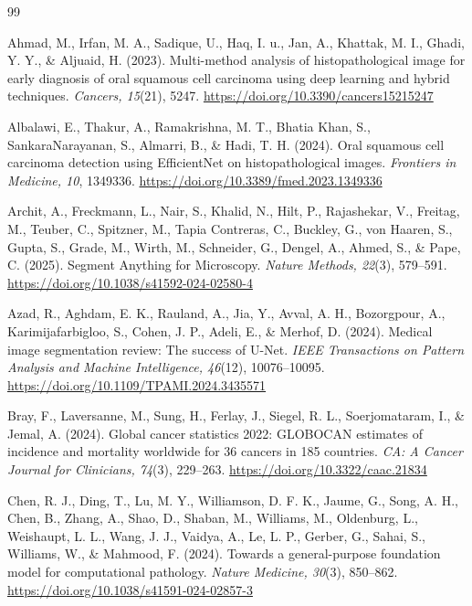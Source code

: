 \documentclass[10pt,twocolumn]{article}
\begin{document}
\begin{thebibliography}{99}
\footnotesize

Ahmad, M., Irfan, M. A., Sadique, U., Haq, I. u., Jan, A., Khattak, M. I., Ghadi, Y. Y., \& Aljuaid, H. (2023). Multi-method analysis of histopathological image for early diagnosis of oral squamous cell carcinoma using deep learning and hybrid techniques. \textit{Cancers, 15}(21), 5247. \url{https://doi.org/10.3390/cancers15215247}

Albalawi, E., Thakur, A., Ramakrishna, M. T., Bhatia Khan, S., SankaraNarayanan, S., Almarri, B., \& Hadi, T. H. (2024). Oral squamous cell carcinoma detection using EfficientNet on histopathological images. \textit{Frontiers in Medicine, 10}, 1349336. \url{https://doi.org/10.3389/fmed.2023.1349336}

Archit, A., Freckmann, L., Nair, S., Khalid, N., Hilt, P., Rajashekar, V., Freitag, M., Teuber, C., Spitzner, M., Tapia Contreras, C., Buckley, G., von Haaren, S., Gupta, S., Grade, M., Wirth, M., Schneider, G., Dengel, A., Ahmed, S., \& Pape, C. (2025). Segment Anything for Microscopy. \textit{Nature Methods, 22}(3), 579--591. \url{https://doi.org/10.1038/s41592-024-02580-4}

Azad, R., Aghdam, E. K., Rauland, A., Jia, Y., Avval, A. H., Bozorgpour, A., Karimijafarbigloo, S., Cohen, J. P., Adeli, E., \& Merhof, D. (2024). Medical image segmentation review: The success of U-Net. \textit{IEEE Transactions on Pattern Analysis and Machine Intelligence, 46}(12), 10076--10095. \url{https://doi.org/10.1109/TPAMI.2024.3435571}

Bray, F., Laversanne, M., Sung, H., Ferlay, J., Siegel, R. L., Soerjomataram, I., \& Jemal, A. (2024). Global cancer statistics 2022: GLOBOCAN estimates of incidence and mortality worldwide for 36 cancers in 185 countries. \textit{CA: A Cancer Journal for Clinicians, 74}(3), 229--263. \url{https://doi.org/10.3322/caac.21834}

Chen, R. J., Ding, T., Lu, M. Y., Williamson, D. F. K., Jaume, G., Song, A. H., Chen, B., Zhang, A., Shao, D., Shaban, M., Williams, M., Oldenburg, L., Weishaupt, L. L., Wang, J. J., Vaidya, A., Le, L. P., Gerber, G., Sahai, S., Williams, W., \& Mahmood, F. (2024). Towards a general-purpose foundation model for computational pathology. \textit{Nature Medicine, 30}(3), 850--862. \url{https://doi.org/10.1038/s41591-024-02857-3}


\end{thebibliography}
\end{document}
